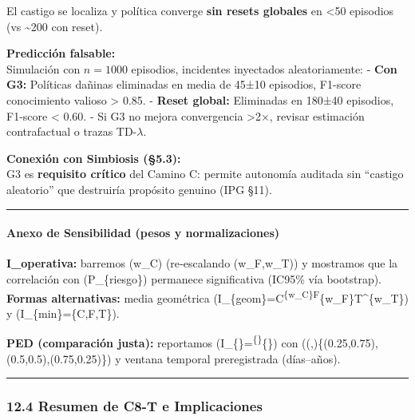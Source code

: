 El castigo se localiza y política converge \textbf{sin resets globales}
en \textless50 episodios (vs \textasciitilde200 con reset).

\textbf{Predicción falsable:}\\
Simulación con \(n=1000\) episodios, incidentes inyectados
aleatoriamente: - \textbf{Con G3:} Políticas dañinas eliminadas en media
de 45±10 episodios, F1-score conocimiento valioso \textgreater{} 0.85. -
\textbf{Reset global:} Eliminadas en 180±40 episodios, F1-score
\textless{} 0.60. - Si G3 no mejora convergencia \textgreater2×, revisar
estimación contrafactual o trazas TD-\(\lambda\).

\textbf{Conexión con Simbiosis (§5.3):}\\
G3 es \textbf{requisito crítico} del Camino C: permite autonomía
auditada sin ``castigo aleatorio'' que destruiría propósito genuino (IPG
§11).

\begin{center}\rule{0.5\linewidth}{0.5pt}\end{center}

\paragraph{\texorpdfstring{\textbf{Anexo de Sensibilidad (pesos y
normalizaciones)}}{Anexo de Sensibilidad (pesos y normalizaciones)}}\label{anexo-de-sensibilidad-pesos-y-normalizaciones}

\textbf{I\_operativa:} barremos (w\_C\in[0.2,0.6]) (re‐escalando
(w\_F,w\_T)) y mostramos que la correlación con (P\_\{riesgo\})
permanece significativa (IC95\% vía bootstrap).\\
\textbf{Formas alternativas:} media geométrica
(I\_\{geom\}=C\textsuperscript{\{w\_C\}F}\{w\_F\}T\^{}\{w\_T\}) y
(I\_\{min\}=\min\{C,F,T\}).

\textbf{PED (comparación justa):} reportamos
(I\_\{\}=\textsuperscript{\{\alpha\}}\{\beta\}\cdot {})
con ((\alpha,\beta)\in\{(0.25,0.75),(0.5,0.5),(0.75,0.25)\}) y ventana
temporal preregistrada (días--años).

\begin{center}\rule{0.5\linewidth}{0.5pt}\end{center}

\subsubsection{12.4 Resumen de C8-T e
Implicaciones}\label{resumen-de-c8-t-e-implicaciones}

